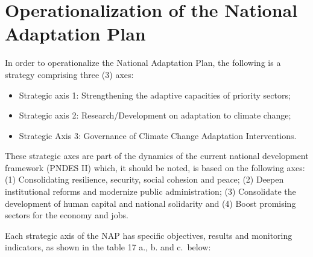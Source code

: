 \documentclass[
]{book}
\begin{document}
\section{Operationalization of the National Adaptation Plan}\label{operationalization-of-the-national-adaptation-plan}

In order to operationalize the National Adaptation Plan, the following is a strategy comprising three (3) axes:

\begin{itemize}
\item
  Strategic axis 1: Strengthening the adaptive capacities of priority sectors;
\item
  Strategic axis 2: Research/Development on adaptation to climate change;
\item
  Strategic Axis 3: Governance of Climate Change Adaptation Interventions.
\end{itemize}

These strategic axes are part of the dynamics of the current national development framework (PNDES II) which, it should be noted, is based on the following axes: (1) Consolidating resilience, security, social cohesion and peace; (2) Deepen institutional reforms and modernize public administration; (3) Consolidate the development of human capital and national solidarity and (4) Boost promising sectors for the economy and jobs.

Each strategic axis of the NAP has specific objectives, results and monitoring indicators, as shown in the table 17 a., b. and c.~below:
\end{document}
